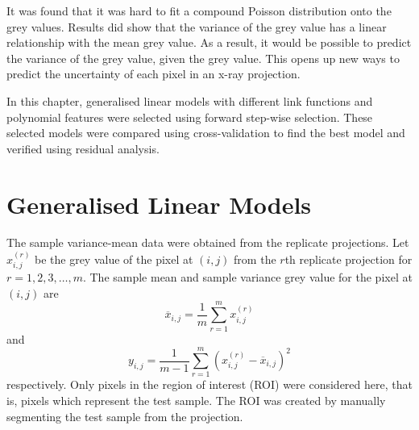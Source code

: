 It was found that it was hard to fit a compound Poisson distribution onto the grey values. Results did show that the variance of the grey value has a linear relationship with the mean grey value. As a result, it would be possible to predict the variance of the grey value, given the grey value. This opens up new ways to predict the uncertainty of each pixel in an x-ray projection.

In this chapter, generalised linear models \citep{nelder1972generalized, nelder1972generalized_2, mccullagh1984generalized} with different link functions and polynomial features were selected using forward step-wise selection. These selected models were compared using cross-validation to find the best model and verified using residual analysis.

\section{Generalised Linear Models}

The sample variance-mean data were obtained from the replicate projections. Let $x_{i,j}^{(r)}$ be the grey value of the pixel at $(i,j)$ from the $r$th replicate projection for $r=1,2,3,\dotsc,m$. The sample mean and sample variance grey value for the pixel at $(i,j)$ are
\begin{equation}
    \overline{x}_{i,j}=\frac{1}{m}\sum_{r=1}^m x_{i,j}^{(r)}
\end{equation}
and
\begin{equation}
    y_{i,j} =
    \frac{1}{m-1}
    \sum_{r=1}^m
        \left(
            x_{i,j}^{(r)} - \overline{x}_{i,j}
        \right)^2
\end{equation}
respectively. Only pixels in the region of interest (ROI) were considered here, that is, pixels which represent the test sample. The ROI was created by manually segmenting the test sample from the projection.

